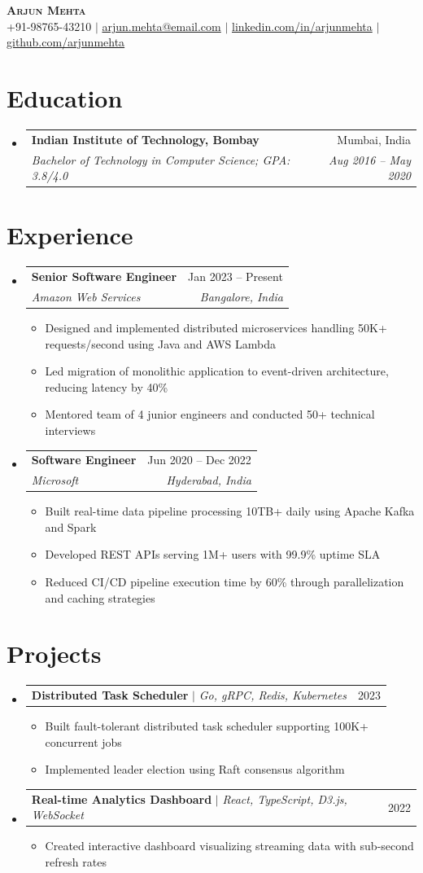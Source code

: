 \documentclass[letterpaper,11pt]{article}
\makeatletter
\newcommand{\resumeItem}[1]{\item\small{#1\vspace{-2pt}}}
\newcommand{\resumeSubheading}[4]{
  \vspace{-2pt}\item
    \begin{tabular*}{0.97\textwidth}[t]{l@{\extracolsep{\fill}}r}
      \textbf{#1} & #2 \\
      \textit{\small#3} & \textit{\small #4} \\
    \end{tabular*}\vspace{-7pt}
}
\newcommand{\resumeProjectHeading}[2]{
    \item
    \begin{tabular*}{0.97\textwidth}{l@{\extracolsep{\fill}}r}
      \small#1 & #2 \\
    \end{tabular*}\vspace{-7pt}
}
\newcommand{\resumeSubHeadingListStart}{\begin{itemize}[leftmargin=0.15in, label={}]}
\newcommand{\resumeSubHeadingListEnd}{\end{itemize}}
\newcommand{\resumeItemListStart}{\begin{itemize}}
\newcommand{\resumeItemListEnd}{\end{itemize}\vspace{-5pt}}
\makeatother
\begin{document}
\begin{center}
    \textbf{\Huge \scshape Arjun Mehta} \\ \vspace{1pt}
    \small +91-98765-43210 $|$ \href{mailto:arjun.mehta@email.com}{arjun.mehta@email.com} $|$ 
    \href{https://linkedin.com/in/arjunmehta}{linkedin.com/in/arjunmehta} $|$
    \href{https://github.com/arjunmehta}{github.com/arjunmehta}
\end{center}

\section{Education}
  \resumeSubHeadingListStart
    \resumeSubheading
      {Indian Institute of Technology, Bombay}{Mumbai, India}
      {Bachelor of Technology in Computer Science; GPA: 3.8/4.0}{Aug 2016 -- May 2020}
  \resumeSubHeadingListEnd

\section{Experience}
  \resumeSubHeadingListStart
    \resumeSubheading
      {Senior Software Engineer}{Jan 2023 -- Present}
      {Amazon Web Services}{Bangalore, India}
      \resumeItemListStart
        \resumeItem{Designed and implemented distributed microservices handling 50K+ requests/second using Java and AWS Lambda}
        \resumeItem{Led migration of monolithic application to event-driven architecture, reducing latency by 40\%}
        \resumeItem{Mentored team of 4 junior engineers and conducted 50+ technical interviews}
      \resumeItemListEnd

    \resumeSubheading
      {Software Engineer}{Jun 2020 -- Dec 2022}
      {Microsoft}{Hyderabad, India}
      \resumeItemListStart
        \resumeItem{Built real-time data pipeline processing 10TB+ daily using Apache Kafka and Spark}
        \resumeItem{Developed REST APIs serving 1M+ users with 99.9\% uptime SLA}
        \resumeItem{Reduced CI/CD pipeline execution time by 60\% through parallelization and caching strategies}
      \resumeItemListEnd
  \resumeSubHeadingListEnd

\section{Projects}
    \resumeSubHeadingListStart
      \resumeProjectHeading
          {\textbf{Distributed Task Scheduler} $|$ \emph{Go, gRPC, Redis, Kubernetes}}{2023}
          \resumeItemListStart
            \resumeItem{Built fault-tolerant distributed task scheduler supporting 100K+ concurrent jobs}
            \resumeItem{Implemented leader election using Raft consensus algorithm}
          \resumeItemListEnd
      \resumeProjectHeading
          {\textbf{Real-time Analytics Dashboard} $|$ \emph{React, TypeScript, D3.js, WebSocket}}{2022}
          \resumeItemListStart
            \resumeItem{Created interactive dashboard visualizing streaming data with sub-second refresh rates}
          \resumeItemListEnd
    \resumeSubHeadingListEnd
\end{document}
